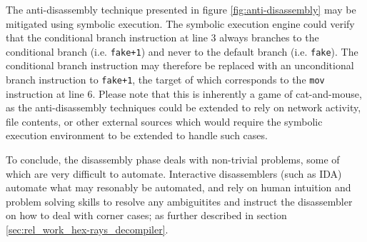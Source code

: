 The anti-disassembly technique presented in figure \ref{fig:anti-disassembly} may be mitigated using symbolic execution. The symbolic execution engine could verify that the conditional branch instruction at line 3 always branches to the conditional branch (i.e. \texttt{fake+1}) and never to the default branch (i.e. \texttt{fake}). The conditional branch instruction may therefore be replaced with an unconditional branch instruction to \texttt{fake+1}, the target of which corresponds to the \texttt{mov} instruction at line 6. Please note that this is inherently a game of cat-and-mouse, as the anti-disassembly techniques could be extended to rely on network activity, file contents, or other external sources which would require the symbolic execution environment to be extended to handle such cases.

To conclude, the disassembly phase deals with non-trivial problems, some of which are very difficult to automate. Interactive disassemblers (such as IDA) automate what may resonably be automated, and rely on human intuition and problem solving skills to resolve any ambiguitites and instruct the disassembler on how to deal with corner cases; as further described in section \ref{sec:rel_work_hex-rays_decompiler}.
